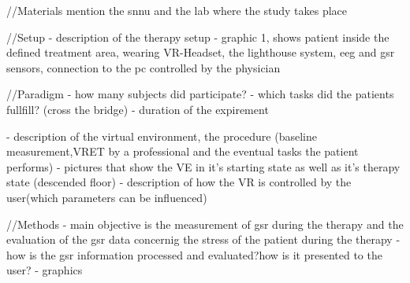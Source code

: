 

//Materials
mention the snnu and the lab where the study takes place


//Setup
- description of the therapy setup
- graphic 1, shows patient inside the defined treatment area, wearing VR-Headset, the lighthouse system, eeg and gsr sensors, connection to the pc controlled by the physician


//Paradigm
- how many subjects did participate?
- which tasks did the patients fullfill? (cross the bridge)
- duration of the expirement

- description of the virtual environment, the procedure (baseline measurement,VRET by a professional and the eventual tasks the patient performs)  
- pictures that show the VE in it's starting state as well as it's therapy state (descended floor)
- description of how the VR is controlled by the user(which parameters can be influenced)

//Methods
- main objective is the measurement of gsr during the therapy and the evaluation of the gsr data concernig the stress of the patient during the therapy
- how is the gsr information processed and evaluated?how is it presented to the user?
- graphics 
